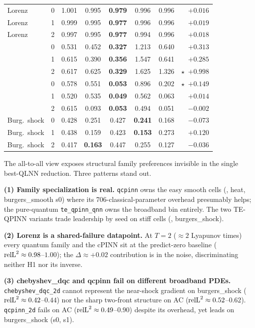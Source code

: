 \begin{table}[t]
\begin{tabular}{lc|cccc|cr}
Lorenz         & 0 & 1.001 & 0.995 & \textbf{0.979} & 0.996 & 0.996 & $+0.016$ \\
Lorenz         & 1 & 0.999 & 0.995 & \textbf{0.977} & 0.996 & 0.996 & $+0.019$ \\
Lorenz         & 2 & 0.997 & 0.995 & \textbf{0.977} & 0.994 & 0.996 & $+0.018$ \\
\fhn{}         & 0 & 0.531 & 0.452 & \textbf{0.327} & 1.213 & 0.640 & $+0.313$ \\
\fhn{}         & 1 & 0.615 & 0.390 & \textbf{0.356} & 1.547 & 0.641 & $+0.285$ \\
\fhn{}         & 2 & 0.617 & 0.625 & \textbf{0.329} & 1.625 & 1.326 & $\star$~$+0.998$ \\
\ac{}          & 0 & 0.578 & 0.551 & \textbf{0.053} & 0.896 & 0.202 & $\star$~$+0.149$ \\
\ac{}          & 1 & 0.520 & 0.535 & \textbf{0.049} & 0.562 & 0.063 & $+0.014$ \\
\ac{}          & 2 & 0.615 & 0.093 & \textbf{0.053} & 0.494 & 0.051 & $-0.002$ \\
Burg.\ shock   & 0 & 0.428 & 0.251 & 0.427 & \textbf{0.241} & 0.168 & $-0.073$ \\
Burg.\ shock   & 1 & 0.438 & 0.159 & 0.423 & \textbf{0.153} & 0.273 & $+0.120$ \\
Burg.\ shock   & 2 & 0.417 & \textbf{0.163} & 0.447 & 0.255 & 0.127 & $-0.036$ \\
\bottomrule
\end{tabular}
\end{table}

The all-to-all view exposes structural family preferences invisible
in the single best-QLNN reduction. Three patterns stand out.

\textbf{(1) Family specialization is real.} \texttt{qcpinn} owns the
easy smooth cells (\lv{}, heat, burgers\_smooth s0) where its
706-classical-parameter overhead presumably helps; the pure-quantum
\texttt{te\_qpinn\_qnn} owns the broadband bin entirely. The two
TE-QPINN variants trade leadership by seed on stiff cells (\vdp{},
burgers\_shock).

\textbf{(2) Lorenz is a shared-failure datapoint.} At $T=2$
($\approx 2$ Lyapunov times) every quantum family and the cPINN
sit at the predict-zero baseline ($\mathrm{relL}^2 \approx 0.98$--$1.00$);
the $\Delta \approx +0.02$ contribution is in the noise, discriminating
neither H1 nor its inverse.

\textbf{(3) chebyshev\_dqc and qcpinn fail on different broadband
PDEs.} \texttt{chebyshev\_dqc\_2d} cannot represent the near-shock
gradient on burgers\_shock ($\mathrm{relL}^2 \approx 0.42$--$0.44$) nor the
sharp two-front structure on AC ($\mathrm{relL}^2 \approx 0.52$--$0.62$).
\texttt{qcpinn\_2d} fails on AC ($\mathrm{relL}^2 \approx 0.49$--$0.90$)
despite its overhead, yet leads on burgers\_shock (s0, s1).

